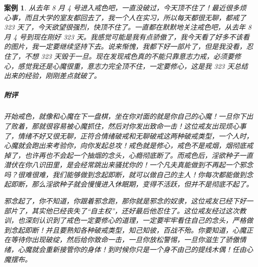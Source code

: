 \documentclass{ctexart}
\newtheorem{case}{案例}
\begin{document}
\begin{case}
    从去年 8 月 4 号进入戒色吧，一直没破过，今天顶不住了！最近很多烦心事，而且大学的室友都回去了，我一个人在实习，所以每天都很无聊，都戒了 323 天了，今天欲望很强烈，快顶不住了。一直都在默默地关注戒色吧，从去年 8 月 4 号到现在刚好 323 天。我感觉可能是我有点骄傲了，我今天看了好多不该看的图片，我一定要继续坚持下去。说来惭愧，我都下好一部片了，但是我没看，忍住了，不想 323 天毁于一旦。现在发现戒色真的不能只靠意志力戒，必须要修心，感觉我还是心魔很重，意志力完全顶不住，一定要修心，这是我 323 天总结出来的经验，刚刚差点就破了。
    \subparagraph{附评} 开始戒色，就像和心魔在下一盘棋，坐在你对面的就是你自己的心魔！一旦你下出了败着，那就很容易被心魔抓住，然后对你发出致命一击！这位戒友出现烦心事了，情绪不好又很无聊，正符合情绪破戒和无聊破戒这两种破戒类型，一个人时，心魔就会跑出来考验你，向你发起总攻！戒色就是修心，戒色不是戒烟，烟彻底戒掉了，也许再也不会起一个抽烟的念头，心瘾彻底断了。而戒色后，淫欲种子一直潜伏在你八识田里，是会经常跳出来骚扰你的！一个凡夫真能做到不再起一个邪念吗？很难很难，我们能够做到念起即断，就可以做自己的主人！你每次都能做到念起即断，那么淫欲种子就会慢慢进入休眠期，变得不活跃，但并不是彻底不起了。

    邪念起了，你不知道，你跟着邪念跑，那你就是邪念的奴隶，这位戒友已经下好一部片了，其实他已经丧失了“自主权”，还好最后他忍住了。这位戒友经过这次教训，也深刻认识到了戒色一定要修心的道理，一定要牢牢看住自己的念头，严格做到念起即断！并且要熟知各种破戒类型，知己知彼，百战不殆。你要知道，心魔正在等待你出现破绽，然后给你致命一击，一旦你放松警惕，一旦你滋生了骄傲情绪，心魔就会重新接管你的身体！到时候你只是一个身不由己的提线木偶！任由心魔摆布。
\end{case}
\end{document}
